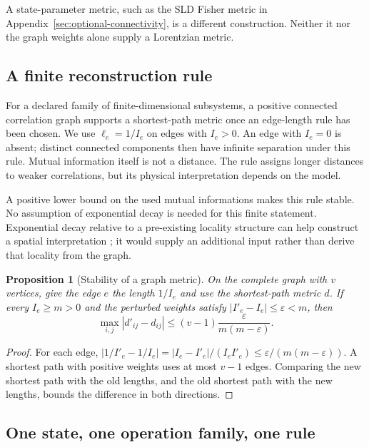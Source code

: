 \documentclass[12pt,a4paper]{article}
\newtheorem{proposition}[theorem]{Proposition}
\begin{document}
A state-parameter metric, such as the SLD Fisher metric in
Appendix~\ref{sec:optional-connectivity}, is a different construction.
Neither it nor the graph weights alone supply a Lorentzian metric.

\subsection{A finite reconstruction rule}

For a declared family of finite-dimensional subsystems, a positive
connected correlation graph supports a shortest-path metric once an
edge-length rule has been chosen. We use $\ell_e=1/I_e$ on edges with
$I_e>0$. An edge with $I_e=0$ is absent; distinct connected components
then have infinite separation under this rule. Mutual information
itself is not a distance. The rule assigns longer distances to weaker
correlations, but its physical interpretation depends on the model.

A positive lower bound on the used mutual informations makes this rule
stable. No assumption of exponential decay is needed for this finite
statement. Exponential decay relative to a pre-existing locality
structure can help construct a spatial interpretation
\cite{Hastings2007,Eisert2010}; it would supply an additional input
rather than derive that locality from the graph.

\begin{proposition}[Stability of a graph metric]
\label{prop:stability}
On the complete graph with $v$ vertices, give the edge $e$ the length $1/I_e$ and use the shortest-path metric $d$. If every $I_e\ge m>0$ and the perturbed weights satisfy $|I'_e-I_e|\le\varepsilon<m$, then
\[
\max_{i,j}|d'_{ij}-d_{ij}|\le(v-1)\frac{\varepsilon}{m(m-\varepsilon)} .
\]
\end{proposition}

\begin{proof}
For each edge, $|1/I'_e-1/I_e|=|I_e-I'_e|/(I_eI'_e)\le\varepsilon/(m(m-\varepsilon))$. A shortest path with positive weights uses at most $v-1$ edges. Comparing the new shortest path with the old lengths, and the old shortest path with the new lengths, bounds the difference in both directions.
\end{proof}

\subsection{One state, one operation family, one rule}
\end{document}
